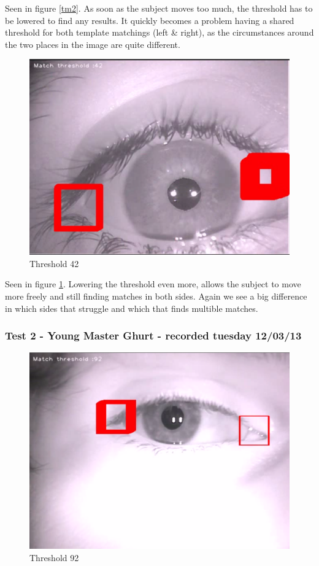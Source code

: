 Seen in figure \ref{tm2}. As soon as the subject moves too much, the
threshold has to be lowered to find any results. It quickly becomes a
problem having a shared threshold for both template matchings (left \&
right), as the circumstances around the two places in the image are
quite different.

\begin{figure}[htbp]
\centering
\includegraphics{pics/template_matching/3.png}
\caption{Threshold 42 \label{tm3}}
\end{figure}

Seen in figure \ref{tm3}. Lowering the threshold even more, allows the
subject to move more freely and still finding matches in both sides.
Again we see a big difference in which sides that struggle and which
that finds multible matches.

\subsubsection{Test 2 - Young Master Ghurt - recorded tuesday 12/03/13}

\begin{figure}[htbp]
\centering
\includegraphics{pics/template_matching/4.png}
\caption{Threshold 92 \label{tm4}}
\end{figure}

